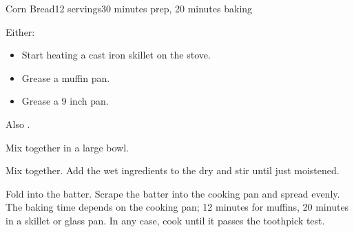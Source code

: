 \documentclass[../Cookbook.tex]{subfiles}
\begin{document}
\begin{recipe}{Corn Bread}{12 servings}{30 minutes prep, 20 minutes baking}

  Either:
  \begin{itemize}
    \item Start heating a cast iron skillet on the stove.
    \item Grease a muffin pan.
    \item Grease a 9 inch pan.
  \end{itemize}
  Also .

  Mix together in a large bowl.

  Mix together.
  Add the wet ingredients to the dry and stir until just moistened.

  Fold into the batter.
  Scrape the batter into the cooking pan and spread evenly.
  The baking time depends on the cooking pan; 12 minutes for muffins, 20 minutes in a skillet or glass pan.
  In any case, cook until it passes the toothpick test.

\end{recipe}
\end{document}

